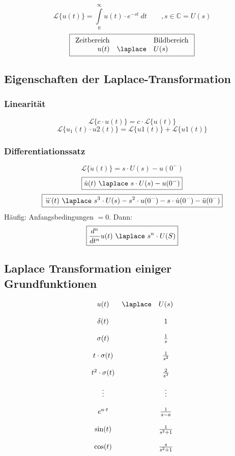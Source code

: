 \[ \boxed{\mathcal{L} \lbrace u(t) \rbrace 
= \int\limits_{0}^{\infty} u(t) \cdot e^{-st} ~ dt \qquad , s \in \mathbb{C} 
= U(s)} \]
\[ \boxed{\begin{array}{rcl}
\text{Zeitbereich} &  & \text{Bildbereich} \\
u(t) & \laplace & U(s)
\end{array}} \]


\subsection{Eigenschaften der Laplace-Transformation}

\subsubsection{Linearität}
\[ \boxed{\mathcal{L}\lbrace c \cdot u(t) \rbrace 
= c \cdot \mathcal{L}\lbrace u(t) \rbrace} \]
\[ \boxed{\mathcal{L}\lbrace u_1(t) \cdot u2(t) \rbrace 
= \mathcal{L}\lbrace u1(t) \rbrace + \mathcal{L}\lbrace u1(t) \rbrace} \]

\subsubsection{Differentiationssatz}
\[ \boxed{\mathcal{L}\lbrace \dot{u}(t) \rbrace = s \cdot U(s) - u(0^-)} \]
\[ \boxed{\dot{u}(t) ~ \laplace ~ s \cdot U(s) - u(0^-)} \]
\[ \boxed{\dddot{u}(t) ~ \laplace ~ s^3 \cdot U(s) - s^2 \cdot u(0^-) 
- s \cdot \dot{u}(0^-) - \ddot{u}(0^-)} \]
Häufig: Anfangsbedingungen $= 0$. 
Dann: 
\[ \boxed{\frac{d^n}{dt^n} u(t) ~ \laplace ~ s^n \cdot U(S)} \]


\subsection{Laplace Transformation einiger Grundfunktionen}
\[ \begin{array}{ccc}
u(t) & \laplace & U(s) \\\\
\delta(t) & 
    & 1 \\\\
\sigma(t) & 
    & \frac{1}{s} \\\\
t \cdot \sigma(t) & 
    & \frac{1}{s^2} \\\\
t^2 \cdot \sigma(t) & 
    & \frac{2}{s^3} \\\\
\vdots & 
    & \vdots \\\\
e^{a \cdot t} & 
    & \frac{1}{s - a} \\\\
\sin(t) & 
    & \frac{1}{s^2 + 1} \\\\
\cos(t) & 
    & \frac{s}{s^2 + 1} \\\\
\end{array} \]